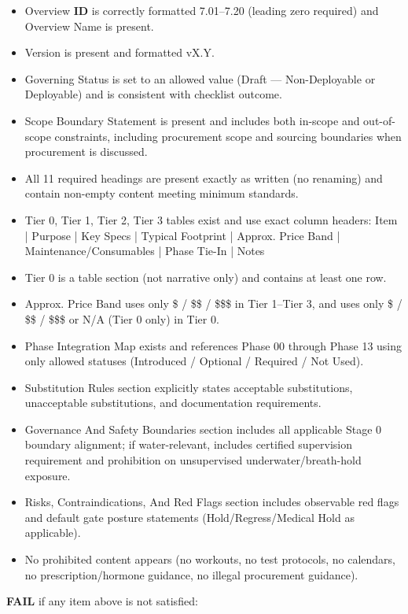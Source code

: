 \documentclass[10pt]{article}
\begin{document}
\begin{itemize}
\item Overview \textbf{ID} is correctly formatted 7.01–7.20 (leading zero required) and Overview Name is present.
\item Version is present and formatted vX.Y.
\item Governing Status is set to an allowed value (Draft — Non-Deployable or Deployable) and is consistent with checklist outcome.
\item Scope Boundary Statement is present and includes both in-scope and out-of-scope constraints, including procurement scope and sourcing boundaries when procurement is discussed.
\item All 11 required headings are present exactly as written (no renaming) and contain non-empty content meeting minimum standards.
\item Tier 0, Tier 1, Tier 2, Tier 3 tables exist and use exact column headers:
  Item | Purpose | Key Specs | Typical Footprint | Approx. Price Band | Maintenance/Consumables | Phase Tie-In | Notes
\item Tier 0 is a table section (not narrative only) and contains at least one row.
\item Approx. Price Band uses only \$ / \$\$ / \$\$\$ in Tier 1–Tier 3, and uses only \$ / \$\$ / \$\$\$ or N/A (Tier 0 only) in Tier 0.
\item Phase Integration Map exists and references Phase 00 through Phase 13 using only allowed statuses (Introduced / Optional / Required / Not Used).
\item Substitution Rules section explicitly states acceptable substitutions, unacceptable substitutions, and documentation requirements.
\item Governance And Safety Boundaries section includes all applicable Stage 0 boundary alignment; if water-relevant, includes certified supervision requirement and prohibition on unsupervised underwater/breath-hold exposure.
\item Risks, Contraindications, And Red Flags section includes observable red flags and default gate posture statements (Hold/Regress/Medical Hold as applicable).
\item No prohibited content appears (no workouts, no test protocols, no calendars, no prescription/hormone guidance, no illegal procurement guidance).
\end{itemize}

\textbf{FAIL} if any item above is not satisfied:
\end{document}
